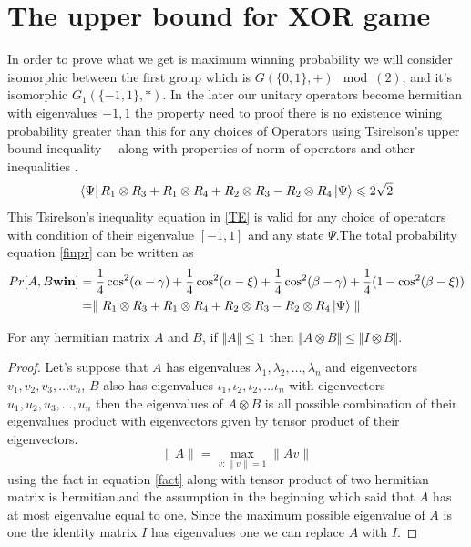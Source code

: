 \section*{The upper bound for XOR game}
In order to prove what we get is maximum winning  probability we will consider isomorphic between  the first group   which is $G(\{0,1\},+) \mod(2)$, and it's isomorphic  $ G_1(\{-1,1\},*)$. In the later our unitary operators  become hermitian with eigenvalues ${-1,1}$ the property need to proof there is  no existence wining probability greater than this for any choices of Operators using Tsirelson’s  upper bound inequality~\citep{Cirel'son1980}~ along with properties of norm of operators  and other inequalities .%
\begin{align}
\bra{\Psi}R_1\otimes R_3+ R_1\otimes R_4+R_2\otimes R_3 -R_2\otimes R_4\ket{\Psi}\leqslant 2\sqrt{2}\label{TE}
\end{align}
This Tsirelson’s inequality equation in  \ref{TE} is valid for any choice of operators with condition of their eigenvalue $\left[-1,1\right]$ and any state $\Psi$.The total probability equation \ref{finpr} can be written as
\begin{align}
Pr[A,B \textbf{win}]&=\frac{1}{4} \cos^2(\alpha-\gamma)+\frac{1}{4} \cos^2(\alpha-\xi)+\frac{1}{4} \cos^2(\beta-\gamma)+\frac{1}{4} (1-\cos^2(\beta-\xi))\nonumber\\
&=\parallel R_1\otimes R_3+ R_1\otimes R_4+R_2\otimes R_3 -R_2\otimes R_4\ket{\Psi}\parallel \label{TE2}
\end{align}
\begin{lemma}
\label{lem:tensor-norm}
For any hermitian matrix $A$ and $B$, if $\Vert A\Vert \leqslant 1$ then $\Vert A\otimes B \Vert \leqslant \Vert I\otimes B \Vert$.
\end{lemma}

\begin{proof}
Let's suppose that $A$ has eigenvalues $\lambda_1,\lambda_2,\dots ,\lambda_n$ and eigenvectors $v_1,v_2,v_3,\dots v_n$, $B$ also has eigenvalues $\iota_1,\iota_2,\iota_2,\dots \iota_n$ with eigenvectors $u_1,u_2,u_3, \dots ,u_n$ then the eigenvalues of $A\otimes B$ is all possible combination of their eigenvalues product with eigenvectors given by tensor product of their eigenvectors.
\begin{equation}
\| A \|=\max_{v: \| v\|=1}\| A v\|\label{fact}
\end{equation}
using the fact in equation \ref {fact} along with tensor product of two hermitian matrix is hermitian.and the   assumption in the  beginning which said that $A$ has at most eigenvalue equal to one. Since the maximum possible eigenvalue of $A$ is one the identity matrix $I$ has eigenvalues one we can replace $A$ with $I$.
\end{proof}

